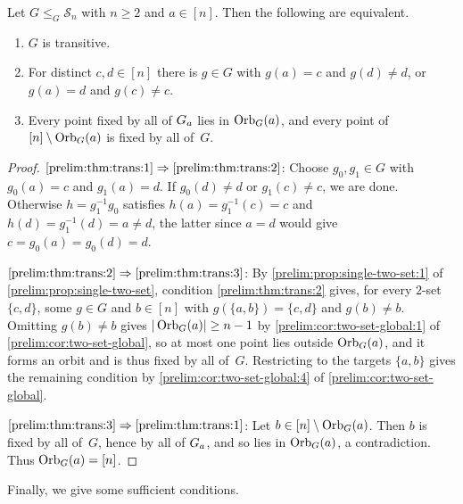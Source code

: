 \begin{theorem} \label{prelim:thm:trans}
	Let $G \le_G \mathcal S_n$ with $n \ge 2$ and $a \in [n]$. Then the following are equivalent.
	\begin{enumerate}
		\item \label{prelim:thm:trans:1} $G$ is transitive.
		
		\item \label{prelim:thm:trans:2} For distinct $c,d \in [n]$ there is $g \in G$ with
		$g(a) = c$ and $g(d) \ne d$, or $g(a) = d$ and $g(c) \ne c$.
		
		\item \label{prelim:thm:trans:3} Every point fixed by all of $\Stab{a}{G}$ lies in
		$\Orbit{a}{G}$, and every point of $[n] \setminus \Orbit{a}{G}$ is fixed by all of~$G$.
	\end{enumerate}
\end{theorem}
\begin{proof}
	$\ref{prelim:thm:trans:1}\Rightarrow\ref{prelim:thm:trans:2}$: Choose $g_0, g_1 \in G$
	with $g_0(a) = c$ and $g_1(a) = d$.
	If $g_0(d) \ne d$ or $g_1(c) \ne c$, we are done.
	Otherwise $h = g_1^{-1}g_0$ satisfies $h(a) = g_1^{-1}(c) = c$ and
	$h(d) = g_1^{-1}(d) = a \ne d$, the latter since $a = d$ would give
	$c = g_0(a) = g_0(d) = d$.
	
	$\ref{prelim:thm:trans:2}\Rightarrow\ref{prelim:thm:trans:3}$: By
	\cref{prelim:prop:single-two-set:1} of \cref{prelim:prop:single-two-set}, condition
	\ref{prelim:thm:trans:2} gives, for every $2$-set $\{c,d\}$, some $g \in G$ and $b \in [n]$
	with $g(\{a,b\}) = \{c,d\}$ and $g(b) \ne b$.
	Omitting $g(b) \ne b$ gives $|\Orbit{a}{G}| \ge n - 1$ by
	\cref{prelim:cor:two-set-global:1} of \cref{prelim:cor:two-set-global}, so at most one point lies
	outside $\Orbit{a}{G}$, and it forms an orbit and is thus fixed by all of~$G$.
	Restricting to the targets $\{a,b\}$ gives the remaining condition by
	\cref{prelim:cor:two-set-global:4} of \cref{prelim:cor:two-set-global}.
	
	$\ref{prelim:thm:trans:3}\Rightarrow\ref{prelim:thm:trans:1}$: 
	Let $b \in [n] \setminus \Orbit{a}{G}$.
	Then $b$ is fixed by all of~$G$, hence by all of $\Stab{a}{G}$, and so lies in
	$\Orbit{a}{G}$, a contradiction.
	Thus $\Orbit{a}{G} = [n]$.
\end{proof}

Finally, we give some sufficient conditions.

